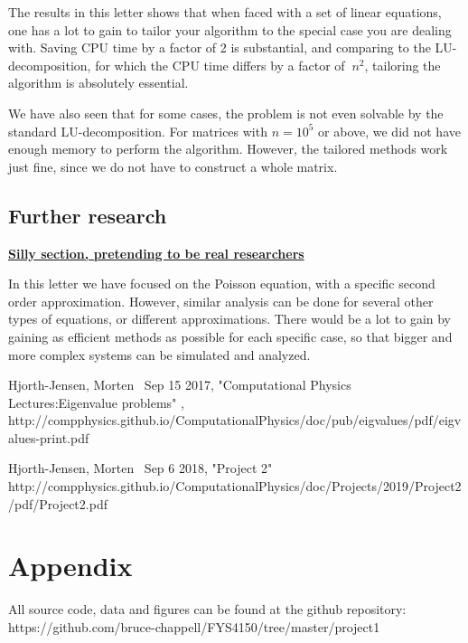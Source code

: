 \documentclass{emulateapj}
\begin{document}
The results in this letter shows that when faced with a set of linear equations, one has a lot to gain to tailor your algorithm to the special case you are dealing with. Saving CPU time by a factor of 2 is substantial, and comparing to the LU-decomposition, for which the CPU time differs by a factor of $~n^2$, tailoring the algorithm is absolutely essential.

We have also seen that for some cases, the problem is not even solvable by the standard LU-decomposition. For matrices with $n=10^5$ or above, we did not have enough memory to perform the algorithm. However, the tailored methods work just fine, since we do not have to construct a whole matrix.

\pagebreak

\subsection{Further research}

\underline{\textbf{Silly section, pretending to be real researchers}}

In this letter we have focused on the Poisson equation, with a specific second order approximation. However, similar analysis can be done for several other types of equations, or different approximations. There would be a lot to gain by gaining as efficient methods as possible for each specific case, so that bigger and more complex systems can be simulated and analyzed.

\begin{thebibliography}{}
 Hjorth-Jensen, Morten \, Sep 15 2017, "Computational Physics Lectures:Eigenvalue problems" , http://compphysics.github.io/ComputationalPhysics/doc/pub/eigvalues/pdf/eigvalues-print.pdf

 Hjorth-Jensen, Morten \, Sep 6 2018, "Project 2"
http://compphysics.github.io/ComputationalPhysics/doc/Projects/2019/Project2/pdf/Project2.pdf

\end{thebibliography}

\section{Appendix}
All source code, data and figures can be found at the github repository: https://github.com/bruce-chappell/FYS4150/tree/master/project1
\end{document}
